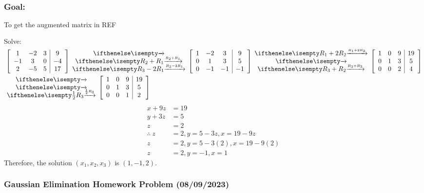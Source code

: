 \documentclass[
  letterpaper,
  DIV=11,
  numbers=noendperiod]{scrartcl}
\begin{document}
\hypertarget{goal}{%
\subsubsection{Goal:}\label{goal}}

To get the augmented matrix in REF

Solve:
\begin{align*}
&\left[\begin{array}{ccc|c}1 & -2 & 3 & 9 \\ -1 & 3 & 0 & -4 \\ 2 & -5 & 5 & 17 \end{array}\right]\rowops{,R_2+R_1,R_3-2R_1}\left[\begin{array}{ccc|c}1 & -2 & 3 & 9 \\ 0 & 1 & 3 & 5 \\ 0 & -1 & -1 & -1 \end{array}\right]\rowops{R_1+2R_2,,R_3+R_2}\left[\begin{array}{ccc|c}1 & 0 & 9 & 19 \\ 0 & 1 & 3 & 5 \\ 0 & 0 & 2 & 4 \end{array}\right] \\
&\rowops{,,\frac{1}{2}R_3}\left[\begin{array}{ccc|c}1 & 0 & 9 & 19 \\ 0 & 1 & 3 & 5 \\ 0 & 0 & 1 & 2\end{array}\right]
\end{align*} \begin{align*}
x + 9z &= 19 \\
y + 3z &= 5 \\
z &= 2 \\
\therefore \ z &= 2, y = 5-3z, x = 19-9z \\
z &= 2, y = 5-3(2), x = 19-9(2) \\
z &= 2, y = -1, x = 1
\end{align*} Therefore, the solution \((x_1, x_2, x_3)\) is
\((1, -1, 2)\).

\hypertarget{gaussian-elimination-homework-problem-08092023}{%
\subsubsection{Gaussian Elimination Homework Problem
(08/09/2023)}\label{gaussian-elimination-homework-problem-08092023}}
\end{document}
